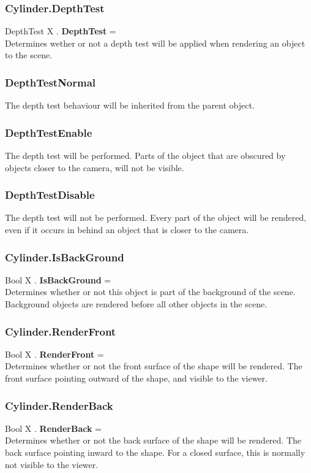 \documentclass[10pt]{book}
\begin{document}
\subsubsection{Cylinder.DepthTest \label{F:Cylinder:DepthTest}}
DepthTest X . \textbf{DepthTest} = \\
Determines wether or not a depth test will be applied when rendering an object to the scene.

\subsubsection{DepthTestNormal \label{T:DepthTest|DepthTestNormal}}
The depth test behaviour will be inherited from the parent object.

\subsubsection{DepthTestEnable \label{T:DepthTest|DepthTestEnable}}
The depth test will be performed. Parts of the object that are obscured by objects closer to the camera, will not be visible.

\subsubsection{DepthTestDisable \label{T:DepthTest|DepthTestDisable}}
The depth test will not be performed. Every part of the object will be rendered, even if it occurs in behind an object that is closer to the camera.

\subsubsection{Cylinder.IsBackGround \label{F:Cylinder:IsBackGround}}
Bool X . \textbf{IsBackGround} = \\
Determines whether or not this object is part of the background of the scene. Background objects are rendered before all other objects in the scene.

\subsubsection{Cylinder.RenderFront \label{F:Cylinder:RenderFront}}
Bool X . \textbf{RenderFront} = \\
Determines whether or not the front surface of the shape will be rendered. The front surface pointing outward of the shape, and visible to the viewer.

\subsubsection{Cylinder.RenderBack \label{F:Cylinder:RenderBack}}
Bool X . \textbf{RenderBack} = \\
Determines whether or not the back surface of the shape will be rendered. The back surface pointing inward to the shape. For a closed surface, this is normally not visible to the viewer.
\end{document}
